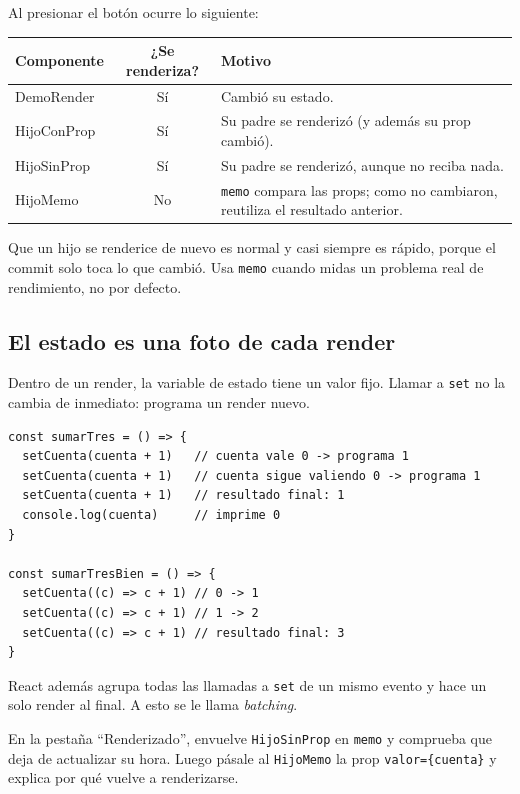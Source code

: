 \documentclass[11pt,a4paper]{article}
\newcommand{\cmd}[1]{\texttt{\color{reactdark}#1}}
\begin{document}
Al presionar el botón ocurre lo siguiente:
\begin{center}
\begin{tabular}{>{\ttfamily}l c p{8cm}}
\toprule
\textrm{\textbf{Componente}} & \textbf{¿Se renderiza?} & \textbf{Motivo} \\
\midrule
DemoRender & Sí & Cambió su estado. \\
HijoConProp & Sí & Su padre se renderizó (y además su prop cambió). \\
HijoSinProp & Sí & Su padre se renderizó, aunque no reciba nada. \\
HijoMemo & No & \cmd{memo} compara las props; como no cambiaron, reutiliza el resultado anterior. \\
\bottomrule
\end{tabular}
\end{center}

\begin{nota}
Que un hijo se renderice de nuevo es normal y casi siempre es rápido, porque el commit solo toca lo que cambió. Usa \cmd{memo} cuando midas un problema real de rendimiento, no por defecto.
\end{nota}

\subsection{El estado es una foto de cada render}

Dentro de un render, la variable de estado tiene un valor fijo. Llamar a \cmd{set} no la cambia de inmediato: programa un render nuevo.

\begin{lstlisting}[language=JSX]
const sumarTres = () => {
  setCuenta(cuenta + 1)   // cuenta vale 0 -> programa 1
  setCuenta(cuenta + 1)   // cuenta sigue valiendo 0 -> programa 1
  setCuenta(cuenta + 1)   // resultado final: 1
  console.log(cuenta)     // imprime 0
}

const sumarTresBien = () => {
  setCuenta((c) => c + 1) // 0 -> 1
  setCuenta((c) => c + 1) // 1 -> 2
  setCuenta((c) => c + 1) // resultado final: 3
}
\end{lstlisting}

React además agrupa todas las llamadas a \cmd{set} de un mismo evento y hace un solo render al final. A esto se le llama \emph{batching}.

\begin{ejercicio}[de render]
En la pestaña ``Renderizado'', envuelve \cmd{HijoSinProp} en \cmd{memo} y comprueba que deja de actualizar su hora. Luego pásale al \cmd{HijoMemo} la prop \cmd{valor=\{cuenta\}} y explica por qué vuelve a renderizarse.
\end{ejercicio}
\end{document}
